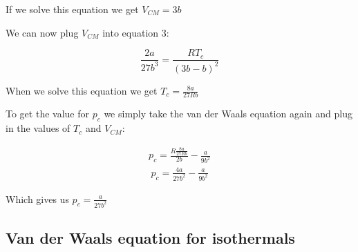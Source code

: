 \documentclass{scrartcl}
\begin{document}
If we solve this equation we get $\boxed{V_{CM}=3b}$
\newline

We can now plug $V_{CM}$ into equation 3:

\begin{equation}
    \frac{2a}{27b^3} = \frac{RT_c}{(3b-b)^2}
\end{equation}

When we solve this equation we get $\boxed{T_c= \frac{8a}{27Rb}}$
\newline

To get the value for $p_c$ we simply take the van der Waals equation again and plug in the values of $T_c$ and $V_{CM}$:

\begin{align}
 p_c= \frac{R\frac{8a}{27Rb}}{2b}-\frac{a}{9b^2}\nonumber
\end{align}
\begin{equation} 
\begin{split}
p_c=\frac{4a}{27b^2}-\frac{a}{9b^2}
\end{split}
\end{equation}

Which gives us $\boxed{p_c=\frac{a}{27b^2}}$

\subsection{Van der Waals equation for isothermals}
\end{document}
